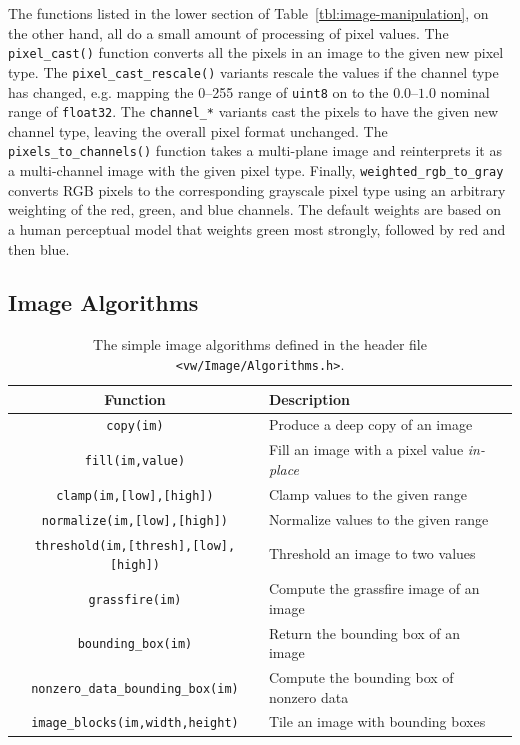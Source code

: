 The functions listed in the lower section of Table~\ref{tbl:image-manipulation}, 
on the other hand, all do a small amount of processing of pixel values.  
The \verb#pixel_cast()# function converts all the pixels in an image to the 
given new pixel type.  The \verb#pixel_cast_rescale()# variants rescale the 
values if the channel type has changed, e.g. mapping the 0--255 range of 
\verb#uint8# on to the $0.0$--$1.0$ nominal range of \verb#float32#.  The 
\verb#channel_*# variants cast the pixels to have the given new channel type, 
leaving the overall pixel format unchanged.  The \verb#pixels_to_channels()# 
function takes a multi-plane image and reinterprets it as a multi-channel 
image with the given pixel type.  Finally, \verb#weighted_rgb_to_gray# converts 
RGB pixels to the corresponding grayscale pixel type using an arbitrary 
weighting of the red, green, and blue channels.  The default weights are 
based on a human perceptual model that weights green most strongly, followed 
by red and then blue.

\subsection{Image Algorithms}

\begin{table}[t]\begin{centering}
\begin{tabular}{|c|l|l|} \hline
Function & Description \\ \hline \hline
\verb#copy(im)# & Produce a deep copy of an image \\ \hline
\verb#fill(im,value)# & Fill an image with a pixel value {\it in-place} \\ \hline
\verb#clamp(im,[low],[high])# & Clamp values to the given range \\ \hline
\verb#normalize(im,[low],[high])# & Normalize values to the given range \\ \hline
\verb#threshold(im,[thresh],[low],[high])# & Threshold an image to two values \\ \hline
\verb#grassfire(im)# & Compute the grassfire image of an image \\ \hline
\verb#bounding_box(im)# & Return the bounding box of an image \\ \hline
\verb#nonzero_data_bounding_box(im)# & Compute the bounding box of nonzero data \\ \hline
\verb#image_blocks(im,width,height)# & Tile an image with bounding boxes \\ \hline
\end{tabular}
\caption{The simple image algorithms defined in the header file {\tt <vw/Image/Algorithms.h>}.}
\label{tbl:image-algorithms}
\end{centering}\end{table}

